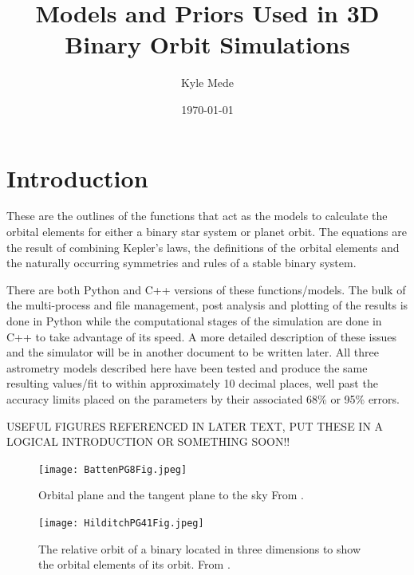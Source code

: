 \documentclass[12pt,preprint]{aastex}
\title{Models and Priors Used in 3D Binary Orbit Simulations}
\author{Kyle Mede}
\date{\today}
\begin{document}
\maketitle

\tableofcontents


\section{Introduction}

These are the outlines of the functions that act as the models to calculate the orbital elements for either a binary star system or planet orbit.  The equations are the result of combining Kepler's laws, the definitions of the orbital elements and the naturally occurring symmetries and rules of a stable binary system.

There are both Python and C++ versions of these functions/models.  The bulk of the multi-process and file management,  post analysis and plotting of the results is done in Python while the computational stages of the simulation are done in C++ to take advantage of its speed.  A more detailed description of these issues and the simulator will be in another document to be written later.  All three astrometry models described here have been tested and produce the same resulting values/fit to within approximately 10 decimal places, well past the accuracy limits placed on the parameters by their associated 68\% or 95\% errors.

\pagebreak

USEFUL FIGURES REFERENCED IN LATER TEXT, PUT THESE IN A LOGICAL INTRODUCTION OR SOMETHING SOON!!

\begin{figure}[htp]
\begin{center}
\texttt{[image: BattenPG8Fig.jpeg]}
\caption[Orbital Plane vs Plane of Sky]{ Orbital plane and the tangent plane to the sky  From \citet{batten}. }
\label{fig:OPvsSky}
\end{center}
\end{figure}

\begin{figure}[htp]
\begin{center}
\texttt{[image: HilditchPG41Fig.jpeg]}
\caption[Orbital Elements]{ The relative orbit of a  binary located in three dimensions to show the orbital elements of its orbit.  From \citet{hilditch}. }
\label{fig:orbElements}
\end{center}
\end{figure}
\end{document}
